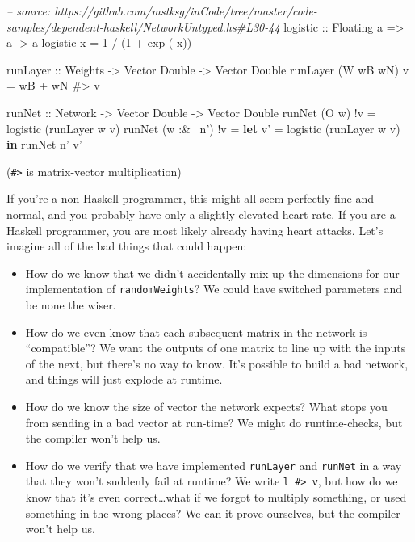 \documentclass[]{article}
\newenvironment{Shaded}{}{}
\newcommand{\KeywordTok}[1]{\textcolor[rgb]{0.00,0.44,0.13}{\textbf{{#1}}}}
\newcommand{\DataTypeTok}[1]{\textcolor[rgb]{0.56,0.13,0.00}{{#1}}}
\newcommand{\DecValTok}[1]{\textcolor[rgb]{0.25,0.63,0.44}{{#1}}}
\newcommand{\CommentTok}[1]{\textcolor[rgb]{0.38,0.63,0.69}{\textit{{#1}}}}
\newcommand{\OtherTok}[1]{\textcolor[rgb]{0.00,0.44,0.13}{{#1}}}
\newcommand{\FunctionTok}[1]{\textcolor[rgb]{0.02,0.16,0.49}{{#1}}}
\newcommand{\NormalTok}[1]{{#1}}
\begin{document}
\begin{Shaded}
\begin{Highlighting}[]
\CommentTok{-- source: https://github.com/mstksg/inCode/tree/master/code-samples/dependent-haskell/NetworkUntyped.hs#L30-44}
\OtherTok{logistic ::} \DataTypeTok{Floating} \NormalTok{a }\OtherTok{=>} \NormalTok{a }\OtherTok{->} \NormalTok{a}
\NormalTok{logistic x }\FunctionTok{=} \DecValTok{1} \FunctionTok{/} \NormalTok{(}\DecValTok{1} \FunctionTok{+} \NormalTok{exp (}\FunctionTok{-}\NormalTok{x))}

\OtherTok{runLayer ::} \DataTypeTok{Weights} \OtherTok{->} \DataTypeTok{Vector} \DataTypeTok{Double} \OtherTok{->} \DataTypeTok{Vector} \DataTypeTok{Double}
\NormalTok{runLayer (}\DataTypeTok{W} \NormalTok{wB wN) v }\FunctionTok{=} \NormalTok{wB }\FunctionTok{+} \NormalTok{wN }\FunctionTok{#>} \NormalTok{v}

\OtherTok{runNet ::} \DataTypeTok{Network} \OtherTok{->} \DataTypeTok{Vector} \DataTypeTok{Double} \OtherTok{->} \DataTypeTok{Vector} \DataTypeTok{Double}
\NormalTok{runNet (}\DataTypeTok{O} \NormalTok{w)      }\FunctionTok{!}\NormalTok{v }\FunctionTok{=} \NormalTok{logistic (runLayer w v)}
\NormalTok{runNet (w }\FunctionTok{:&~} \NormalTok{n') }\FunctionTok{!}\NormalTok{v }\FunctionTok{=} \KeywordTok{let} \NormalTok{v' }\FunctionTok{=} \NormalTok{logistic (runLayer w v)}
                       \KeywordTok{in}  \NormalTok{runNet n' v'}
\end{Highlighting}
\end{Shaded}

(\texttt{\#\textgreater{}} is matrix-vector multiplication)

If you're a non-Haskell programmer, this might all seem perfectly fine
and normal, and you probably have only a slightly elevated heart rate.
If you are a Haskell programmer, you are most likely already having
heart attacks. Let's imagine all of the bad things that could happen:

\begin{itemize}
\item
  How do we know that we didn't accidentally mix up the dimensions for
  our implementation of \texttt{randomWeights}? We could have switched
  parameters and be none the wiser.
\item
  How do we even know that each subsequent matrix in the network is
  ``compatible''? We want the outputs of one matrix to line up with the
  inputs of the next, but there's no way to know. It's possible to build
  a bad network, and things will just explode at runtime.
\item
  How do we know the size of vector the network expects? What stops you
  from sending in a bad vector at run-time? We might do runtime-checks,
  but the compiler won't help us.
\item
  How do we verify that we have implemented \texttt{runLayer} and
  \texttt{runNet} in a way that they won't suddenly fail at runtime? We
  write \texttt{l\ \#\textgreater{}\ v}, but how do we know that it's
  even correct\ldots{}what if we forgot to multiply something, or used
  something in the wrong places? We can it prove ourselves, but the
  compiler won't help us.
\end{itemize}
\end{document}
